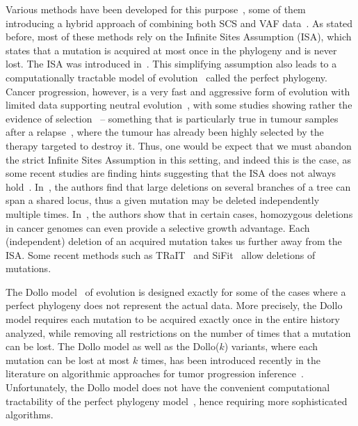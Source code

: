 \documentclass[a4paper,USenglish]{article}
\theoremstyle{definition}
\begin{document}
Various methods have been developed for this
purpose~\cite{Jahn2016,Ross2016, Zafar2017}, some of them introducing
a hybrid approach of combining both SCS and VAF
data~\cite{Ramazzotti132183, Malikic234914, Salehi2017}.  As stated
before, most of these methods rely on the Infinite Sites Assumption
(ISA), which states that a mutation is acquired at most once in the
phylogeny and is never lost. The ISA was introduced
in~\cite{Kimura1969}.  This simplifying assumption also leads to a
computationally tractable model of evolution~\cite{gusfield1991}
called the perfect phylogeny.  Cancer progression, however, is a very
fast and aggressive form of evolution with limited data supporting
neutral evolution~\cite{DAVIS2017151}, with some studies showing
rather the evidence of selection~\cite{Bignell2010,DAVIS2017151} --
something that is particularly true in tumour samples after a
relapse~\cite{Ding2012,Gillies2012,DAVIS2017151}, where the tumour has
already been highly selected by the therapy targeted to destroy it.
Thus, one would be expect that we must abandon the strict Infinite
Sites Assumption in this setting, and indeed this is the case, as some
recent studies are finding hints suggesting that the ISA does not
always hold~\cite{Kuipers13102017,Brown2017,Bignell2010}.
In~\cite{Brown2017}, the authors find that large deletions on several
branches of a tree can span a shared locus, thus a given mutation may
be deleted independently multiple times.  In~\cite{Bignell2010}, the
authors show that in certain cases, homozygous deletions in cancer
genomes can even provide a selective growth advantage. Each
(independent) deletion of an acquired mutation takes us further away
from the ISA. Some recent methods such as
TRaIT~\cite{Ramazzotti132183} and SiFit~\cite{Zafar2017} allow
deletions of mutations.

The Dollo model~\cite{Rogozin2006} of evolution is designed exactly
for some of the cases where a perfect phylogeny does not represent the
actual data.  More precisely, the Dollo model requires each mutation
to be acquired exactly once in the entire history analyzed, while
removing all restrictions on the number of times that a mutation can
be lost.  The Dollo model as well as the Dollo($k$) variants, where
each mutation can be lost at most $k$ times, has been introduced
recently in the literature on algorithmic approaches for tumor
progression
inference~\cite{Bonizzoni:2017:BPP:3107411.3107441,Ciccolella268243}.
Unfortunately, the Dollo model does not have the convenient
computational tractability of the perfect phylogeny
model~\cite{gusfield1991}, hence requiring more sophisticated
algorithms.
\end{document}
